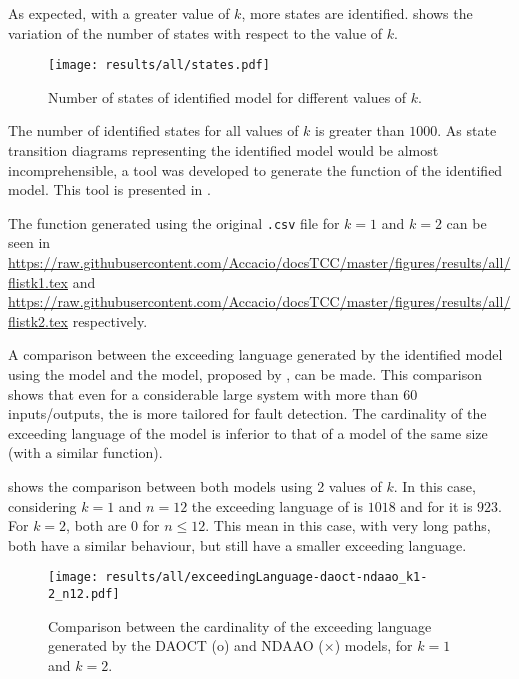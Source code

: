 As expected, with a greater value of $k$, more states are identified. 
 shows the variation of the number of
states with respect to the value of $k$.
\begin{figure}[H]
  \centering
  \texttt{[image: results/all/states.pdf]}
  \caption{Number of states of identified model for different values of $k$.}
    \label{fig:statesIdentOriginal}
\end{figure}

The number of identified states for all values of $k$ is greater than $1000$. As
state transition diagrams representing the identified model would be almost
incomprehensible, a tool was developed to generate the \ffunction{} function of
the identified model. This tool is presented in .

The \ffunction{} function generated using the original \verb|.csv| file
for $k=1$ and $k=2$
can be seen in  
\url{https://raw.githubusercontent.com/Accacio/docsTCC/master/figures/results/all/flistk1.tex}
and
\url{https://raw.githubusercontent.com/Accacio/docsTCC/master/figures/results/all/flistk2.tex}
respectively.

A comparison between the exceeding language generated by the
identified model using the \DAOCT{} model and the \NDAAO{} model, proposed by
\cite{klein2005fault}, can be made. This comparison shows that even for a considerable
large system with more than 60 inputs\slash outputs, the \DAOCT{} is more
tailored for fault detection. The cardinality of the exceeding language of the
\DAOCT{} model is
inferior to that of a \NDAAO{} model of the same size (with a similar \ffunction{} function).

 shows the comparison between both models using 2 values of $k$.
In this case, considering $k=1$ and $n=12$ the
exceeding language of \NDAAO{} is $1018$ and for \DAOCT{} it is $923$. For $k=2$, both are $0$ for $n\leq12$. This mean in this case, with very
long paths, both have a similar behaviour, but \DAOCT{} still have a smaller exceeding language.
\begin{figure}[H]
  \centering
  \texttt{[image: results/all/exceedingLanguage-daoct-ndaao\_k1-2\_n12.pdf]}
  \caption{Comparison between the cardinality of the exceeding language generated by the DAOCT (o) and
NDAAO ($\times$) models, for $k=1$ and $k=2$.}
    \label{fig:daoctNdaaoOriginal}
\end{figure}

